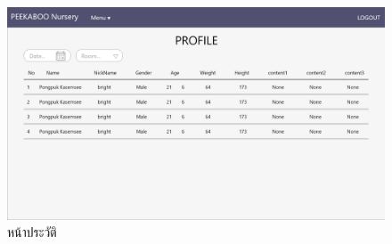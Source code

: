 \begin{figure}
  \begin{center}
    \includegraphics[width=\linewidth]{images/ProfileOnePage.png}
  \end{center}
  \caption[หน้าประวัติ]{หน้าประวัติ}
  \label{fig:old3}
\end{figure}




